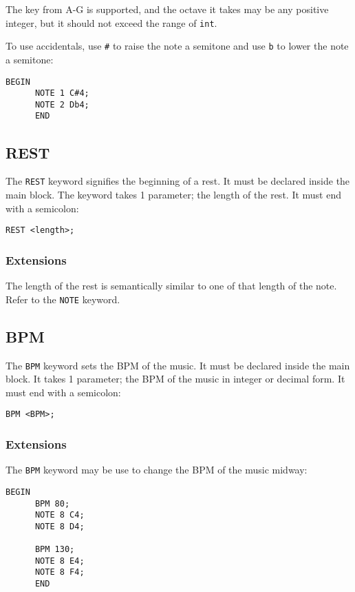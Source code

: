 \documentclass{article}
\begin{document}
The key from A-G is supported, and the octave it takes may be any positive integer, but
it should not exceed the range of \verb+int+. \newline

To use accidentals, use \verb+#+ to raise the note a semitone and use \verb+b+ to lower the
note a semitone:
\begin{Verbatim}[frame=single]
      BEGIN
      NOTE 1 C#4;
      NOTE 2 Db4;
      END
\end{Verbatim}

\subsection{REST}
The \verb+REST+ keyword signifies the beginning of a rest. It must be declared inside
the main block.
The keyword takes 1 parameter; the length of the rest. It must end with a semicolon:
\begin{Verbatim}[frame=single]
      REST <length>;
\end{Verbatim}

\subsubsection{Extensions}

The length of the rest is semantically similar to one of that length
of the note. Refer to the \verb+NOTE+ keyword.

\subsection{BPM}

The \verb+BPM+ keyword sets the BPM of the music. It must be declared inside the main block.
It takes 1 parameter; the BPM of the music in integer or decimal form. It must end
with a semicolon:
\begin{Verbatim}[frame=single]
      BPM <BPM>;
\end{Verbatim}

\subsubsection{Extensions}

The \verb+BPM+ keyword may be use to change the BPM of the music midway:
\begin{Verbatim}[frame=single]
      BEGIN
      BPM 80;
      NOTE 8 C4;
      NOTE 8 D4;

      BPM 130;
      NOTE 8 E4;
      NOTE 8 F4;
      END
\end{Verbatim}
\end{document}
